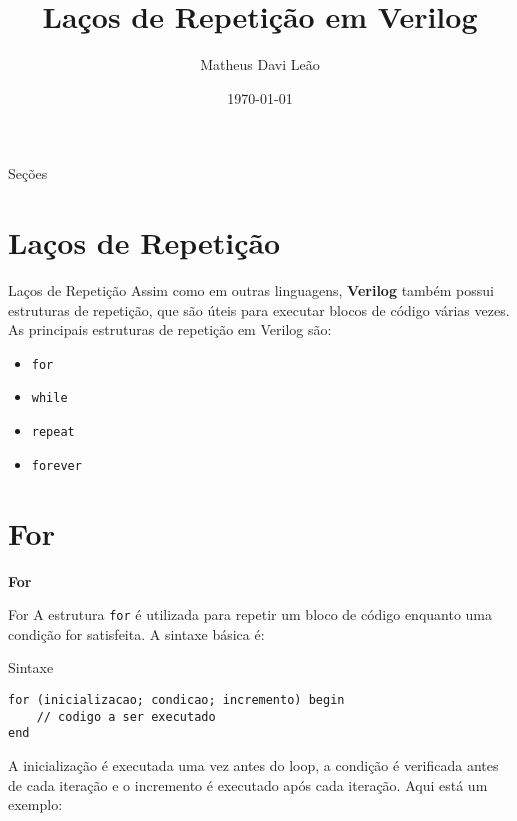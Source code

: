 \documentclass[aspectratio=169,xcolor=dvipsnames]{beamer}
\title{Laços de Repetição em Verilog}
\author{Matheus Davi Leão}
\institute{
    Poliware \\
    Escola Politécnica da Universidade de São Paulo
}
\date{\today}
\begin{document}
\begin{frame}
    \titlepage
\end{frame}

\begin{frame}{Seções}
    \tableofcontents
\end{frame}

\section{Laços de Repetição}

\begin{frame}{Laços de Repetição}
Assim como em outras linguagens, \textbf{Verilog} também possui estruturas de repetição, que são úteis para executar blocos de código várias vezes. As principais estruturas de repetição em Verilog são:

\begin{itemize}
  \item \texttt{for}
  \item \texttt{while}
  \item \texttt{repeat}
  \item \texttt{forever}
\end{itemize}
\end{frame}

\section{For}

\begin{frame}
    \Huge{\centerline{\textbf{For}}}
\end{frame}

\begin{frame}[fragile]{For}
A estrutura \texttt{for} é utilizada para repetir um bloco de código enquanto uma condição for satisfeita. A sintaxe básica é:

\begin{block}{Sintaxe}
\begin{verbatim}
for (inicializacao; condicao; incremento) begin
    // codigo a ser executado
end
\end{verbatim}
\end{block}

A inicialização é executada uma vez antes do loop, a condição é verificada antes de cada iteração e o incremento é executado após cada iteração. Aqui está um exemplo:
\end{frame}
\end{document}
